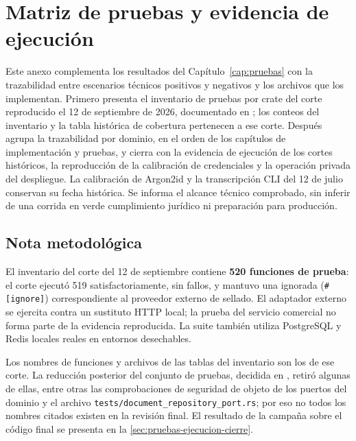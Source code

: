 \chapter{Matriz de pruebas y evidencia de ejecución}\label{anexo:matriz}

Este anexo complementa los resultados del Capítulo~\ref{cap:pruebas} con la trazabilidad entre escenarios técnicos positivos y negativos y los archivos que los implementan. Primero presenta el inventario de pruebas por crate del corte reproducido el 12 de septiembre de 2026, documentado en ; los conteos del inventario y la tabla histórica de cobertura pertenecen a ese corte. Después agrupa la trazabilidad por dominio, en el orden de los capítulos de implementación y pruebas, y cierra con la evidencia de ejecución de los cortes históricos, la reproducción de la calibración de credenciales y la operación privada del despliegue. La calibración de Argon2id y la transcripción CLI del 12 de julio conservan su fecha histórica. Se informa el alcance técnico comprobado, sin inferir de una corrida en verde cumplimiento jurídico ni preparación para producción.

\section{Nota metodológica}\label{sec:matriz-nota}

El inventario del corte del 12 de septiembre contiene \textbf{520 funciones de prueba}: el corte ejecutó 519 satisfactoriamente, sin fallos, y mantuvo una ignorada (\texttt{\#[ignore]}) correspondiente al proveedor externo de sellado. El adaptador externo se ejercita contra un sustituto HTTP local; la prueba del servicio comercial no forma parte de la evidencia reproducida. La suite también utiliza PostgreSQL y Redis locales reales en entornos desechables.

Los nombres de funciones y archivos de las tablas del inventario son los de ese corte. La reducción posterior del conjunto de pruebas, decidida en , retiró algunas de ellas, entre otras las comprobaciones de seguridad de objeto de los puertos del dominio y el archivo \texttt{tests/document\_repository\_port.rs}; por eso no todos los nombres citados existen en la revisión final. El resultado de la campaña sobre el código final se presenta en la \cref{sec:pruebas-ejecucion-cierre}.

